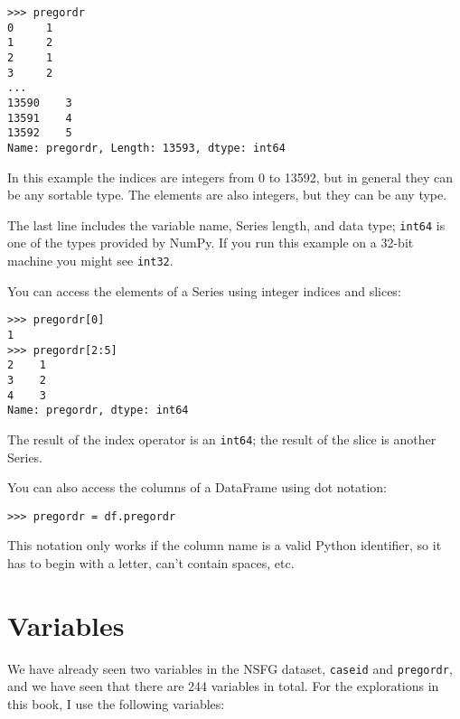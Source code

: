 \documentclass[12pt]{book}
\begin{document}
\begin{verbatim}
>>> pregordr
0     1
1     2
2     1
3     2
...
13590    3
13591    4
13592    5
Name: pregordr, Length: 13593, dtype: int64
\end{verbatim}

In this example the indices are integers from 0 to 13592, but in
general they can be any sortable type.  The elements
are also integers, but they can be any type.

The last line includes the variable name, Series length, and data type;
{\tt int64} is one of the types provided by NumPy.  If you run
this example on a 32-bit machine you might see {\tt int32}.

You can access the elements of a Series using integer indices
and slices:

\begin{verbatim}
>>> pregordr[0]
1
>>> pregordr[2:5]
2    1
3    2
4    3
Name: pregordr, dtype: int64
\end{verbatim}

The result of the index operator is an {\tt int64}; the
result of the slice is another Series.

You can also access the columns of a DataFrame using dot notation:

\begin{verbatim}
>>> pregordr = df.pregordr
\end{verbatim}

This notation only works if the column name is a valid Python
identifier, so it has to begin with a letter, can't contain spaces, etc.


\section{Variables}

We have already seen two variables in the NSFG dataset, {\tt caseid}
and {\tt pregordr}, and we have seen that there are 244 variables in
total.  For the explorations in this book, I use the following
variables:
\end{document}
